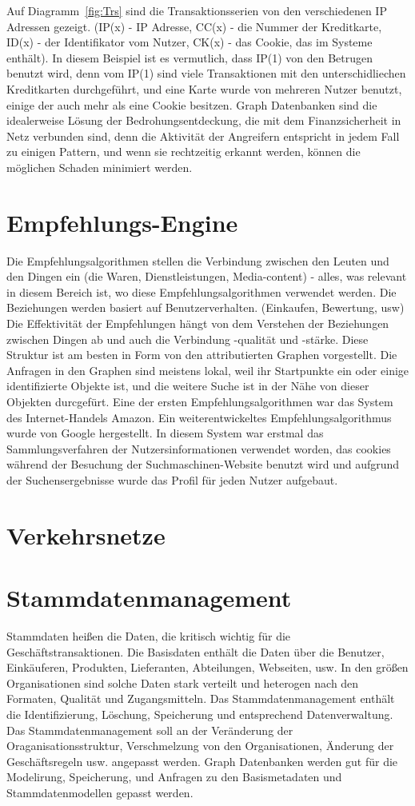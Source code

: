 Auf Diagramm~\ref{fig:Trs} sind die Transaktionsserien von den verschiedenen IP Adressen gezeigt. (IP(x) - IP Adresse, CC(x) - die Nummer der Kreditkarte, ID(x) - der Identifikator vom Nutzer, CK(x) - das Cookie, das im Systeme enthält). In diesem Beispiel ist es vermutlich, dass IP(1) von den Betrugen benutzt wird, denn vom IP(1) sind viele Transaktionen mit den unterschidliechen Kreditkarten durchgeführt, und eine Karte wurde von mehreren Nutzer benutzt, einige der auch mehr als eine Cookie besitzen. 
Graph Datenbanken sind die idealerweise Lösung der Bedrohungsentdeckung, die mit dem Finanzsicherheit in Netz verbunden sind, denn die Aktivität der Angreifern entspricht in jedem Fall zu einigen Pattern, und wenn sie rechtzeitig erkannt werden, können die möglichen Schaden minimiert werden.

\section{Empfehlungs-Engine}
Die Empfehlungsalgorithmen stellen die Verbindung zwischen den Leuten und den Dingen ein (die Waren, Dienstleistungen, Media-content) - alles, was relevant in diesem Bereich ist, wo diese Empfehlungsalgorithmen verwendet werden. Die Beziehungen werden basiert auf Benutzerverhalten. (Einkaufen, Bewertung, usw)
Die Effektivität der Empfehlungen hängt von dem Verstehen der Beziehungen zwischen Dingen ab und auch die Verbindung -qualität und -stärke. Diese Struktur ist am besten in Form von den attributierten Graphen vorgestellt. Die Anfragen in den Graphen sind meistens lokal, weil ihr Startpunkte ein oder einige identifizierte Objekte ist, und die weitere Suche ist in der Nähe von dieser Objekten durcgefürt.
Eine der ersten Empfehlungsalgorithmen war das System des Internet-Handels Amazon. Ein weiterentwickeltes Empfehlungsalgorithmus wurde von Google hergestellt. In diesem System war erstmal das Sammlungsverfahren der Nutzersinformationen verwendet worden, das cookies während der Besuchung der Suchmaschinen-Website benutzt wird und aufgrund der Suchensergebnisse wurde das Profil für jeden Nutzer aufgebaut.

\section{Verkehrsnetze}
\section{Stammdatenmanagement}
Stammdaten heißen die Daten, die kritisch wichtig für die Geschäftstransaktionen. Die Basisdaten enthält die Daten über die Benutzer, Einkäuferen, Produkten, Lieferanten, Abteilungen, Webseiten, usw. In den größen Organisationen sind solche Daten stark verteilt und heterogen nach den Formaten, Qualität und Zugangsmitteln. Das Stammdatenmanagement enthält die Identifizierung, Löschung, Speicherung und entsprechend Datenverwaltung. Das Stammdatenmanagement soll an der Veränderung der Oraganisationsstruktur, Verschmelzung von den Organisationen, Änderung der Geschäftsregeln usw. angepasst werden. Graph Datenbanken werden gut für die Modelirung, Speicherung, und Anfragen zu den Basismetadaten und Stammdatenmodellen gepasst werden. 


